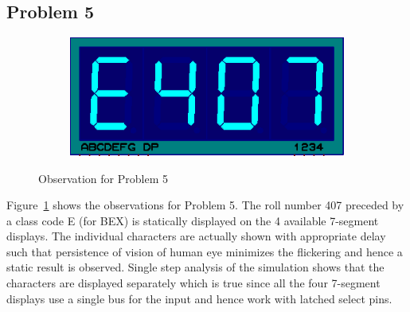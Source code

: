 \documentclass{lab_sheet}
\begin{document}
            \subsection*{Problem 5}
            \begin{figure}[H]
              \hspace*{\fill}
                \begin{subfigure}{.33\textwidth}
                  \centering
                    \includegraphics[frame,width=.9\linewidth]{../Figures/static_roll}  
                \end{subfigure} 
                \hspace*{\fill}
                \caption{Observation for Problem 5}
                \label{fig:prob5}
            \end{figure}
            Figure~\ref{fig:prob5} shows the observations for Problem 5. The roll number 407 preceded by a class code E (for BEX) is statically displayed on the 4 available 7-segment displays. The individual characters are actually shown with appropriate delay such that persistence of vision of human eye minimizes the flickering and hence a static result is observed. Single step analysis of the simulation shows that the characters are displayed separately which is true since all the four 7-segment displays use a single bus for the input and hence work with latched select pins.
\end{document}
